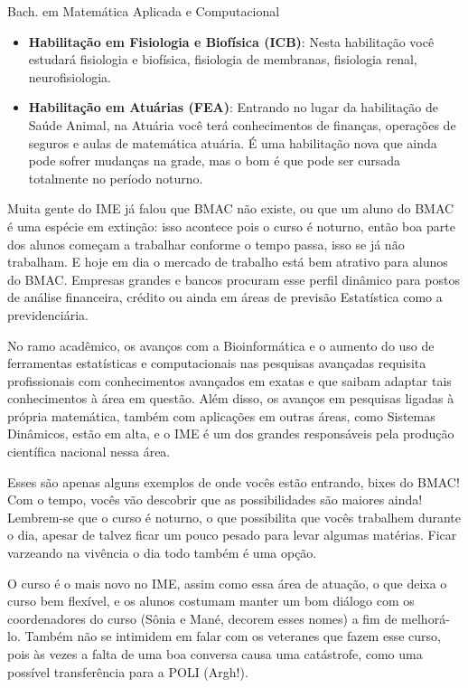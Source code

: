 \begin{subsecao}{Bach. em Matemática Aplicada e Computacional}
\begin{itemize}
    pensou sobre toda a matemática que está por trás disso? As matérias são dadas na
    FSP (A Faculdade de Saúde Pública é vizinha da Medicina e fica ao lado do
    metrô Clínicas) e você terá aula com alunos não só do IME, mas também dos
    cursos que são oferecidos na unidade.
  \item \textbf{Habilitação em Fisiologia e Biofísica (ICB)}:
    Nesta habilitação você estudará fisiologia e biofísica, fisiologia de
    membranas, fisiologia renal, neurofisiologia.
  \item \textbf{Habilitação em Atuárias (FEA)}:
   Entrando no lugar da habilitação de Saúde Animal, na Atuária você terá 
   conhecimentos de finanças, operações de seguros e aulas de matemática atuária. 
   É uma habilitação nova que ainda pode sofrer mudanças na grade, mas o bom é que 
   pode ser cursada totalmente no período noturno.
\end{itemize}

Muita gente do IME já falou que BMAC não existe, ou que um aluno do BMAC é uma
espécie em extinção: isso acontece pois o curso é noturno, então boa parte
dos alunos começam a trabalhar conforme o tempo passa, isso se já não trabalham.
E hoje em dia o mercado de trabalho está bem atrativo para alunos do BMAC.
Empresas grandes e bancos procuram esse perfil dinâmico para postos de análise
financeira, crédito ou ainda em áreas de previsão Estatística como a
previdenciária.

No ramo acadêmico, os avanços com a Bioinformática e o aumento do uso de
ferramentas estatísticas e computacionais nas pesquisas avançadas requisita
profissionais com conhecimentos avançados em exatas e que saibam adaptar tais
conhecimentos à área em questão. Além disso, os avanços em pesquisas ligadas à
própria matemática, também com aplicações em outras áreas, como Sistemas
Dinâmicos, estão em alta, e o IME é um dos grandes responsáveis pela produção
científica nacional nessa área.

Esses são apenas alguns exemplos de onde vocês estão entrando, bixes do BMAC! Com o tempo,
vocês vão descobrir que as possibilidades são maiores ainda! Lembrem-se que o
curso é noturno, o que possibilita que vocês trabalhem durante o dia, apesar de talvez
ficar um pouco pesado para levar algumas matérias. Ficar varzeando na vivência o dia todo
também é uma opção.

O curso é o mais novo no IME, assim como essa área de atuação, o que deixa o curso
bem flexível, e os alunos costumam manter um bom diálogo com os coordenadores do
curso (Sônia e Mané, decorem esses nomes) a fim de melhorá-lo. Também não se intimidem
em falar com os veteranes que fazem esse curso, pois às vezes a falta de uma boa conversa
causa uma catástrofe, como uma possível transferência para a POLI (Argh!).

\end{subsecao}
